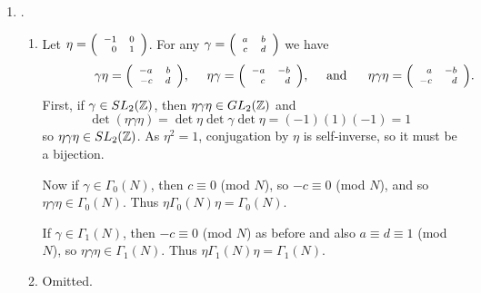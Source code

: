\begin{enumerate}
\item {}.
\begin{enumerate}
\item Let $\eta = {\scriptsize \left(\begin{array}{rr}-1 & 0 \\ 0 & 1
      \end{array}\right)} $. For any $\gamma = {\scriptsize
    \left(\begin{array}{cc}a & b \\c & d \end{array}\right)}$ we have
$$\qquad\qquad \gamma \eta =  {\scriptsize  \left(\begin{array}{rr}-a & b \\ -c & d \end{array}\right)},~~~~
\eta \gamma = {\scriptsize \left(\begin{array}{rr}-a & -b \\ c & d
    \end{array}\right)},~~~~ \mbox{and}~~~~~ \eta \gamma \eta =
{\scriptsize \left(\begin{array}{rr} a & -b \\ -c & d
    \end{array}\right)}.
 $$
 First, if $\gamma \in SL_2(\mathbb{Z})$, then $\eta \gamma \eta \in GL_2(\mathbb{Z})$
 and $$\det (\eta \gamma \eta) = \det \eta \det \gamma \det \eta =
 (-1)(1)(-1) = 1$$ so $\eta \gamma \eta \in SL_2(\mathbb{Z})$. As $\eta^2 = 1$,
 conjugation by $\eta$ is self-inverse, so it must be a bijection.

 Now if $\gamma \in \Gamma_0(N)$, then $c \equiv 0$ (mod $N$), so $-c
 \equiv 0$ (mod $N$), and so $\eta \gamma \eta \in \Gamma_0(N)$. Thus
 $\eta\Gamma_0(N)\eta = \Gamma_0(N)$.

 If $\gamma \in \Gamma_1(N)$, then $-c \equiv 0$ (mod $N$) as before
 and also $a \equiv d \equiv 1$ (mod $N$), so $\eta \gamma \eta \in
 \Gamma_1(N)$. Thus $\eta\Gamma_1(N)\eta = \Gamma_1(N)$.

\item Omitted.

\end{enumerate}


\end{enumerate}


